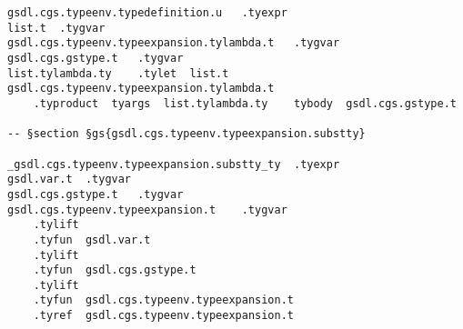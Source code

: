 \documentclass{report}
\begin{document}
\begin{verbatim}
gsdl.cgs.typeenv.typedefinition.u	.tyexpr
list.t	.tygvar
gsdl.cgs.typeenv.typeexpansion.tylambda.t	.tygvar
gsdl.cgs.gstype.t	.tygvar
list.tylambda.ty	.tylet	list.t	gsdl.cgs.typeenv.typeexpansion.tylambda.t
	.typroduct	tyargs	list.tylambda.ty	tybody	gsdl.cgs.gstype.t

-- §section §gs{gsdl.cgs.typeenv.typeexpansion.substty}

_gsdl.cgs.typeenv.typeexpansion.substty_ty	.tyexpr
gsdl.var.t	.tygvar
gsdl.cgs.gstype.t	.tygvar
gsdl.cgs.typeenv.typeexpansion.t	.tygvar
	.tylift
	.tyfun	gsdl.var.t
	.tylift
	.tyfun	gsdl.cgs.gstype.t
	.tylift
	.tyfun	gsdl.cgs.typeenv.typeexpansion.t
	.tyref	gsdl.cgs.typeenv.typeexpansion.t
\end{verbatim}
\end{document}
